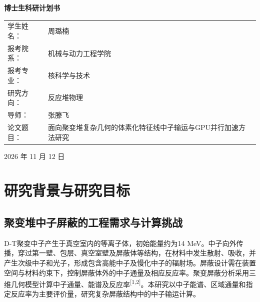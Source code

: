 \documentclass[UTF8, zihao=-4, fontset=none, a4paper]{ctexart}
\newcommand{\upcite}[1]{\textsuperscript{[#1]}}
\begin{document}
\begin{titlepage}
  \centering
  \vspace*{2.4cm}
  {\bfseries 博士生科研计划书\par}
  \vspace{2.2cm}
  \begin{minipage}{0.9\linewidth}
    \renewcommand{\arraystretch}{1.9}
    \begin{tabular}{@{}>{\raggedright\arraybackslash}p{5em}>{\raggedright\arraybackslash}p{\dimexpr\linewidth-5em-2\tabcolsep\relax}@{}}
      学生姓名： & 周璐楠 \\
      报考院系： & 机械与动力工程学院 \\
      报考专业： & 核科学与技术 \\
      研究方向： & 反应堆物理 \\
      导师： & 张滕飞 \\
      论文题目： & 面向聚变堆复杂几何的体素化特征线中子输运与GPU并行加速方法研究
    \end{tabular}
  \end{minipage}
  \vfill
  { 2026 年 11 月 12 日\par}
  \vspace*{1cm}
\end{titlepage}

\begingroup
\linespread{1.05}\selectfont
\setlength{\parskip}{0pt}
\tableofcontents
\endgroup
\clearpage

\setcounter{page}{1}




\section{研究背景与研究目标}\label{sec:1}
\subsection{聚变堆中子屏蔽的工程需求与计算挑战}
D-T聚变中子产生于真空室内的等离子体，初始能量约为14 MeV。中子向外传播，穿过第一壁、包层、真空室壁及屏蔽体等结构，在材料中发生散射、吸收，并产生次级中子和光子，形成包含高能中子及慢化中子的辐射场。屏蔽设计需在装置空间与材料约束下，控制屏蔽体外的中子通量及相应反应率。聚变屏蔽分析采用三维几何模型计算中子通量、能谱及反应率\upcite{1,2}。本研究以中子能谱、区域通量和指定反应率为主要评价量，研究复杂屏蔽结构中的中子输运计算。
\end{document}
